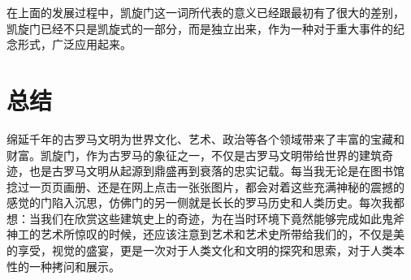 \documentclass[a4paper,dvipdfm]{article}
\begin{document}
在上面的发展过程中，凯旋门这一词所代表的意义已经跟最初有了很大的差别，
凯旋门已经不只是凯旋式的一部分，而是独立出来，作为一种对于重大事件的纪
念形式，广泛应用起来。

\clearpage

\section{总结}

绵延千年的古罗马文明为世界文化、艺术、政治等各个领域带来了丰富的宝藏和
财富。凯旋门，作为古罗马的象征之一，不仅是古罗马文明带给世界的建筑奇
迹，也是古罗马文明从起源到鼎盛再到衰落的忠实记载。每当我无论是在图书馆
捻过一页页画册、还是在网上点击一张张图片，都会对着这些充满神秘的震撼的
感觉的门陷入沉思，仿佛门的另一侧就是长长的罗马历史和人类历史。每次我都
想：当我们在欣赏这些建筑史上的奇迹，为在当时环境下竟然能够完成如此鬼斧
神工的艺术所惊叹的时候，还应该注意到艺术和艺术史所带给我们的，不仅是美
的享受，视觉的盛宴，更是一次对于人类文化和文明的探究和思索，对于人类本
性的一种拷问和展示。

\cite{*}

\appendix{}



\end{document}
